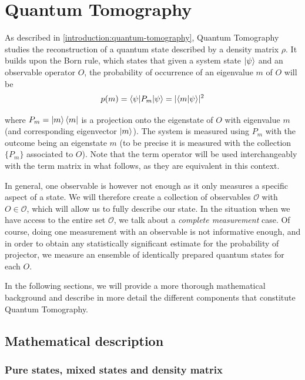 \documentclass[12pt]{memoir}
\newcommand{\ti}{\textit}
\begin{document}
\section{Quantum Tomography}\label{section:quantum-tomography}

As described in \ref{introduction:quantum-tomography}, Quantum Tomography studies the reconstruction of a quantum state described by a density matrix $\rho$. It builds upon the Born rule, which states that given a system state $\ket \psi$ and an observable operator $O$, the probability of occurrence of an eigenvalue $m$ of $O$ will be
\begin{equation}
    p(m) = \braket{\psi | P_m| \psi} = \lvert\braket{m|\psi}\rvert^2
\end{equation}

where $P_m = \ket m \bra m$ is a projection onto the eigenstate of $O$ with eigenvalue $m$ (and corresponding eigenvector $\ket m$). The system is measured using $P_m$ with the outcome being an eigenstate $m$ (to be precise it is measured with the collection $\{P_m\}$ associated to $O$). Note that the term operator will be used interchangeably with the term matrix in what follows, as they are equivalent in this context.\medbreak


In general, one observable is however not enough as it only measures a specific aspect of a state. We will therefore create a collection of observables $\mathcal{O}$ with $O \in \mathcal{O}$, which will allow us to fully describe our state. In the situation when we have access to the entire set $\mathcal{O}$, we talk about a \ti{complete measurement} case. Of course, doing one measurement with an observable is not informative enough, and in order to obtain any statistically significant estimate for the probability of projector, we measure an ensemble of identically prepared quantum states for each $O$. \medbreak


In the following sections, we will provide a more thorough mathematical background and describe in more detail the different components that constitute Quantum Tomography.

\subsection{Mathematical description} \label{background:Quantum Tomography:math}


\subsubsection*{Pure states, mixed states and density matrix}
\end{document}
